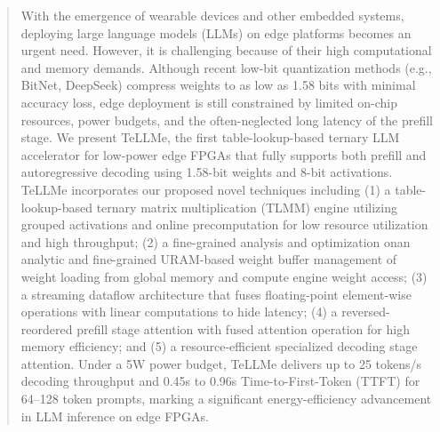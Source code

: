 \documentclass[sigconf]{acmart}
\begin{document}
\begin{abstract}
With the emergence of wearable devices and other embedded systems, 
deploying large language models (LLMs) on edge platforms becomes an urgent need. However, it is challenging because of their high computational and memory demands. Although recent low-bit quantization methods (e.g., BitNet, DeepSeek) compress weights to as low as 1.58 bits with minimal accuracy loss, edge deployment is still constrained by limited on-chip resources, power budgets, and the often-neglected long latency of the prefill stage. 
We present TeLLMe, the first table-lookup-based ternary LLM accelerator for low-power edge FPGAs that fully supports both prefill and autoregressive decoding using 1.58-bit weights and 8-bit activations. TeLLMe incorporates our proposed novel techniques including (1) a table-lookup-based ternary matrix multiplication (TLMM) engine utilizing grouped activations and online precomputation for low resource utilization and high throughput; (2) a fine-grained analysis and optimization onan analytic and fine-grained URAM-based weight buffer management of weight loading from global memory and compute engine weight access; (3) a streaming dataflow architecture that fuses floating-point element-wise operations with linear computations to hide latency; (4) a reversed-reordered prefill stage attention with fused attention operation for high memory efficiency; and (5) a resource-efficient specialized decoding stage attention. Under a 5W power budget, TeLLMe delivers up to 25 tokens/s decoding throughput and 0.45s to 0.96s Time-to-First-Token (TTFT) for 64–128 token prompts, marking a significant energy-efficiency advancement in LLM inference on edge FPGAs. %

\end{abstract}
\end{document}
